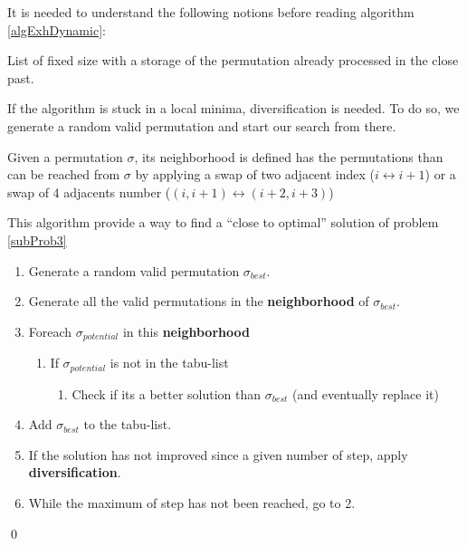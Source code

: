 It is needed to understand the following notions before reading algorithm \ref{algExhDynamic}:
\begin{description}[topsep=0pt,itemsep=0ex,partopsep=1ex,parsep=1ex]
 \item[Tabu-list:] List of fixed size with a storage of the permutation already processed in the close past.
 \item[Diversification:] If the algorithm is stuck in a local minima, diversification is needed. 
To do so, we generate a random valid permutation and start our search from there.
 \item[Neighborhood:] Given a permutation $\sigma$, its neighborhood is defined has the permutations than can be reached from $\sigma$ by applying a swap of two adjacent index ($i \leftrightarrow i+1$) or a swap of 4 adjacents number ($(i,i+1) \leftrightarrow (i+2,i+3)$)
\end{description}


\begin{algorithm}
  This algorithm provide a way to find a ``close to optimal'' solution of problem \ref{subProb3} 
\begin{enumerate}[topsep=1ex,itemsep=0ex,partopsep=1ex,parsep=1ex]
   \item Generate a random valid permutation $\sigma_{best}$.
   \item Generate all the valid permutations in the \textbf{neighborhood} of $\sigma_{best}$.
   \item Foreach $\sigma_{potential}$ in this \textbf{neighborhood}
\begin{enumerate}[topsep=0pt,itemsep=0ex,partopsep=1ex,parsep=1ex]
    \item If $\sigma_{potential}$ is not in the tabu-list
    \begin{enumerate}
     \item Check if its a better solution than $\sigma_{best}$ (and eventually replace it)
     \end{enumerate}
   \end{enumerate}
     \item Add $\sigma_{best}$ to the tabu-list.
     \item If the solution has not improved since a given number of step, apply \textbf{diversification}.
   \item While the maximum of step has not been reached, go to 2. 
  \end{enumerate}
   \qed
 \label{tabuSearchAlg}
\end{algorithm}

